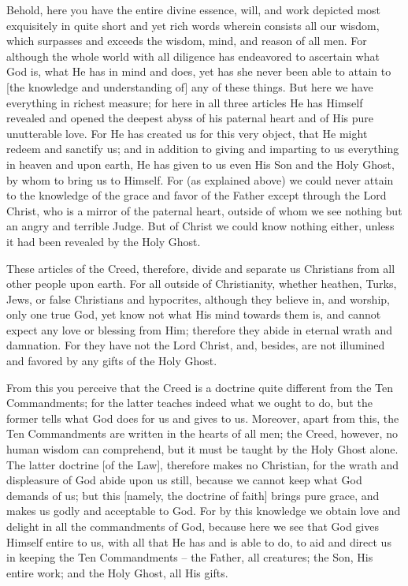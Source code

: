 Behold, here you have the entire divine essence, will, and work
depicted most exquisitely in quite short and yet rich words wherein
consists all our wisdom, which surpasses and exceeds the wisdom, mind,
and reason of all men. For although the whole world with all diligence
has endeavored to ascertain what God is, what He has in mind and does,
yet has she never been able to attain to [the knowledge and
understanding of] any of these things. But here we have everything in
richest measure; for here in all three articles He has Himself revealed
and opened the deepest abyss of his paternal heart and of His pure
unutterable love. For He has created us for this very object, that He
might redeem and sanctify us; and in addition to giving and imparting
to us everything in heaven and upon earth, He has given to us even His
Son and the Holy Ghost, by whom to bring us to Himself. For (as
explained above) we could never attain to the knowledge of the grace
and favor of the Father except through the Lord Christ, who is a mirror
of the paternal heart, outside of whom we see nothing but an angry and
terrible Judge. But of Christ we could know nothing either, unless it
had been revealed by the Holy Ghost.

These articles of the Creed, therefore, divide and separate us
Christians from all other people upon earth. For all outside of
Christianity, whether heathen, Turks, Jews, or false Christians and
hypocrites, although they believe in, and worship, only one true God,
yet know not what His mind towards them is, and cannot expect any love
or blessing from Him; therefore they abide in eternal wrath and
damnation. For they have not the Lord Christ, and, besides, are not
illumined and favored by any gifts of the Holy Ghost.

From this you perceive that the Creed is a doctrine quite different
from the Ten Commandments; for the latter teaches indeed what we ought
to do, but the former tells what God does for us and gives to us.
Moreover, apart from this, the Ten Commandments are written in the
hearts of all men; the Creed, however, no human wisdom can comprehend,
but it must be taught by the Holy Ghost alone. The latter doctrine [of
the Law], therefore makes no Christian, for the wrath and displeasure
of God abide upon us still, because we cannot keep what God demands of
us; but this [namely, the doctrine of faith] brings pure grace, and
makes us godly and acceptable to God. For by this knowledge we obtain
love and delight in all the commandments of God, because here we see
that God gives Himself entire to us, with all that He has and is able
to do, to aid and direct us in keeping the Ten Commandments -- the
Father, all creatures; the Son, His entire work; and the Holy Ghost,
all His gifts.

